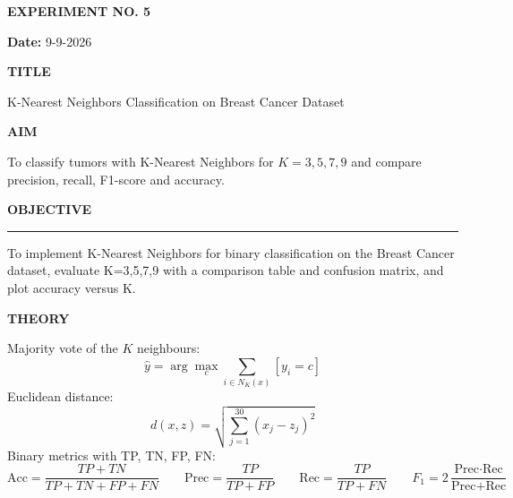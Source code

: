 \documentclass[11pt,twoside]{article}
\newcommand{\expheading}[1]{{\fontsize{14}{17}\selectfont\textbf{#1}\par}}
\newcommand{\fullrule}{\noindent\rule{\textwidth}{0.6pt}\par}
\begin{document}
{\setlength{\parskip}{1pt}\setlength{\abovedisplayskip}{2pt}\setlength{\belowdisplayskip}{2pt}
\begin{center}
\expheading{EXPERIMENT NO. 5}
\end{center}
\vspace{2pt}

\noindent\textbf{Date:} 9-9-2026\par
\vspace{6pt}

\expheading{TITLE}
\vspace{4pt}
\noindent K-Nearest Neighbors Classification on Breast Cancer Dataset\par
\vspace{4pt}

\expheading{AIM}
\vspace{4pt}
\noindent To classify tumors with K-Nearest Neighbors for $K=3,5,7,9$ and compare precision, recall, F1-score and accuracy. \par
\vspace{4pt}

\expheading{OBJECTIVE}
\vspace{2pt}
\fullrule
\vspace{4pt}
\noindent To implement K-Nearest Neighbors for binary classification on the Breast Cancer dataset, evaluate K=3,5,7,9 with a comparison table and confusion matrix, and plot accuracy versus K. \par
\vspace{4pt}

\expheading{THEORY}
\vspace{4pt}
Majority vote of the $K$ neighbours:
\[\hat{y}=\arg\max_c\sum_{i\in N_K(x)}[y_i=c]\]
Euclidean distance:
\[d(x,z)=\sqrt{\sum_{j=1}^{30}(x_j-z_j)^2}\]
Binary metrics with TP, TN, FP, FN:
\[\text{Acc}=\frac{TP+TN}{TP+TN+FP+FN}\qquad \text{Prec}=\frac{TP}{TP+FP}\qquad \text{Rec}=\frac{TP}{TP+FN}\qquad F_1=2\frac{\text{Prec}\cdot\text{Rec}}{\text{Prec}+\text{Rec}}\]
\vspace{4pt}

}
\end{document}
